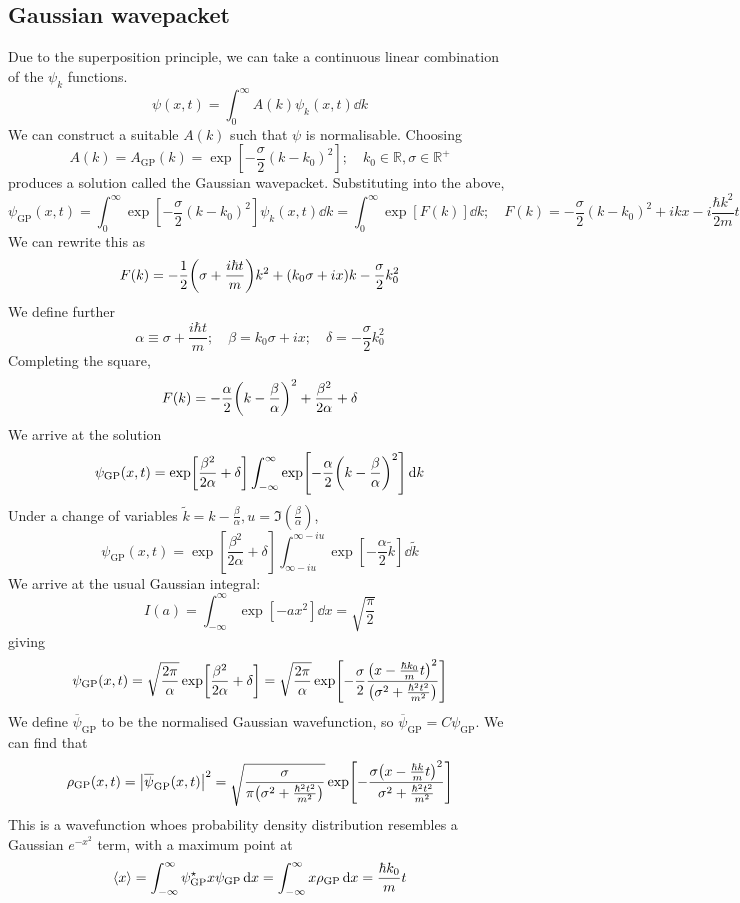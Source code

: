 \subsection{Gaussian wavepacket}
Due to the superposition principle, we can take a continuous linear combination of the \( \psi_k \) functions.
\[ \psi(x,t) = \int_0^\infty A(k) \psi_k(x,t) \dd{k} \]
We can construct a suitable \( A(k) \) such that \( \psi \) is normalisable.
Choosing
\[ A(k) = A_{\text{GP}}(k) = \exp[-\frac{\sigma}{2}(k-k_0)^2];\quad k_0 \in \mathbb R, \sigma \in \mathbb R^+ \]
produces a solution called the Gaussian wavepacket.
Substituting into the above,
\[ \psi_{\text{GP}}(x,t) = \int_0^\infty \exp[-\frac{\sigma}{2}(k-k_0)^2] \psi_k(x,t) \dd{k} = \int_0^\infty \exp[F(k)] \dd{k};\quad F(k) = -\frac{\sigma}{2}(k-k_0)^2 + ikx - i \frac{\hbar k^2}{2m} t \]
We can rewrite this as
\[ F(k) = -\frac{1}{2}\qty(\sigma + \frac{i \hbar t}{m}) k^2 + (k_0 \sigma + ix)k - \frac{\sigma}{2} k_0^2 \]
We define further
\[ \alpha \equiv \sigma + \frac{i \hbar t}{m};\quad \beta = k_0 \sigma + ix;\quad \delta = -\frac{\sigma}{2} k_0^2 \]
Completing the square,
\[ F(k) = -\frac{\alpha}{2} \qty(k - \frac{\beta}{\alpha})^2 + \frac{\beta^2}{2\alpha} + \delta \]
We arrive at the solution
\[ \psi_{\text{GP}}(x,t) = \exp[\frac{\beta^2}{2\alpha} + \delta] \int_{-\infty}^\infty \exp[-\frac{\alpha}{2}\qty(k - \frac{\beta}{\alpha})^2 ] \dd{k} \]
Under a change of variables \( \widetilde k = k - \frac{\beta}{\alpha}, u = \Im(\frac{\beta}{\alpha}) \),
\[ \psi_{\text{GP}}(x,t) = \exp[\frac{\beta^2}{2\alpha} + \delta] \int_{\infty - iu}^{\infty - iu} \exp[-\frac{\alpha}{2} \widetilde k] \dd{\widetilde k} \]
We arrive at the usual Gaussian integral:
\[ I(a) = \int_{-\infty}^\infty \exp[-a x^2] \dd{x} = \sqrt{\frac{\pi}{2}} \]
giving
\[ \psi_{\text{GP}}(x,t) = \sqrt{\frac{2 \pi}{\alpha}} \exp[\frac{\beta^2}{2\alpha} + \delta] = \sqrt{\frac{2\pi}{\alpha}} \exp[-\frac{\sigma}{2} \frac{\qty(x - \frac{\hbar k_0}{m} t)^2}{\qty(\sigma^2 + \frac{\hbar^2 t^2}{m^2} )} ] \]
We define \( \overline \psi_{\text{GP}} \) to be the normalised Gaussian wavefunction, so \( \overline \psi_{\text{GP}} = C \psi_{\text{GP}} \).
We can find that
\[ \rho_{\text{GP}}(x,t) = \abs{\overline \psi_{\text{GP}}(x,t)}^2 = \sqrt{\frac{\sigma}{\pi \qty(\sigma^2 + \frac{\hbar^2 t^2}{m^2})}} \exp[ - \frac{\sigma\qty(x - \frac{\hbar k}{m} t)^2}{\sigma^2 + \frac{\hbar^2 t^2}{m^2}} ] \]
This is a wavefunction whoes probability density distribution resembles a Gaussian \( e^{-x^2} \) term, with a maximum point at
\[ \left\langle{x}\right\rangle = \int_{-\infty}^\infty \psi_{\text{GP}}^\star x \psi_{\text{GP}} \dd{x} = \int_{-\infty}^\infty x \rho_{\text{GP}} \dd{x} = \frac{\hbar k_0}{m} t \]
